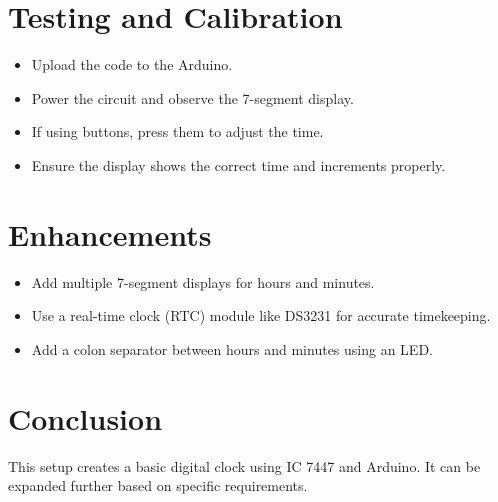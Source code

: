 \documentclass[journal]{IEEEtran}
\numberwithin{equation}{enumi}
\numberwithin{figure}{enumi}
\begin{document}
\section{Testing and Calibration}
\begin{itemize}
    \item Upload the code to the Arduino.
    \item Power the circuit and observe the 7-segment display.
    \item If using buttons, press them to adjust the time.
    \item Ensure the display shows the correct time and increments properly.
\end{itemize}

\section{Enhancements}
\begin{itemize}
    \item Add multiple 7-segment displays for hours and minutes.
    \item Use a real-time clock (RTC) module like DS3231 for accurate timekeeping.
    \item Add a colon separator between hours and minutes using an LED.
\end{itemize}

\section{Conclusion}
This setup creates a basic digital clock using IC 7447 and Arduino. It can be expanded further based on specific requirements.
\end{document}
